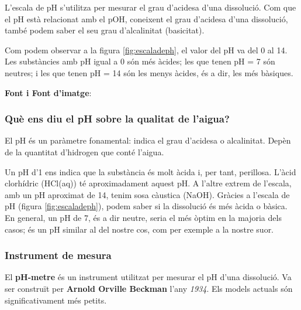 L'escala de pH s'utilitza per mesurar el grau d'acidesa d'una dissolució. Com que el pH està relacionat amb el pOH, coneixent el grau d'acidesa d'una dissolució, també podem saber el seu grau d'alcalinitat (basicitat).%

Com podem observar a la figura \ref{fig:escaladeph}, el valor del pH va del 0 al 14. Les substàncies amb pH igual a 0 són més àcides; les que tenen pH = 7 són neutres; i les que tenen pH = 14 són les menys àcides, és a dir, les més bàsiques.

\textbf{Font i Font d'imatge}: \cite{PH}

\subsubsection{Què ens diu el pH sobre la qualitat de l'aigua?}
El pH és un paràmetre fonamental: indica el grau d'acidesa o alcalinitat. Depèn de la quantitat d'hidrogen que conté l'aigua.

Un pH d'1 ens indica que la substància és molt àcida i, per tant, perillosa. L'àcid clorhídric (HCl(aq)) té aproximadament aquest pH. A l'altre extrem de l'escala, amb un pH aproximat de 14, tenim sosa càustica (NaOH). Gràcies a l'escala de pH (figura \ref{fig:escaladeph}), podem saber si la dissolució és més àcida o bàsica. En general, un pH de 7, és a dir neutre, seria el més òptim en la majoria dels casos; és un pH similar al del nostre cos, com per exemple a la nostre suor.


\subsubsection{Instrument de mesura}
El \textbf{pH-metre} és un instrument utilitzat per mesurar el pH d’una dissolució. Va ser construït per \textbf{Arnold Orville Beckman} l’any \textit{1934}. Els models actuals són significativament més petits.

